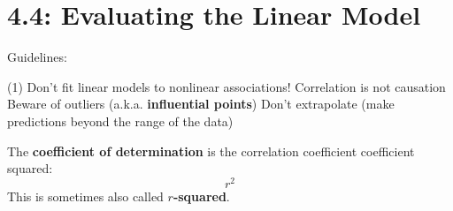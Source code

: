 \documentclass[../mathNotesPreamble]{subfiles}
\begin{document}
  \section{4.4: Evaluating the Linear Model}
    Guidelines:
    \begin{tasks}[after-item-skip=\stretch{1}, label=\textbullet](1)
      \task Don't fit linear models to nonlinear associations!
      \task Correlation is not causation
      \task Beware of outliers (a.k.a. \textbf{influential points})
      \task Don't extrapolate (make predictions beyond the range of the data)
    \end{tasks}
    \pagebreak
    
    \begin{defn*}
      The \textbf{coefficient of determination} is the correlation coefficient coefficient squared: 
        \[r^2\]
      This is sometimes also called \textbf{$r$-squared}.
    \end{defn*}

  \pagebreak
\end{document}
